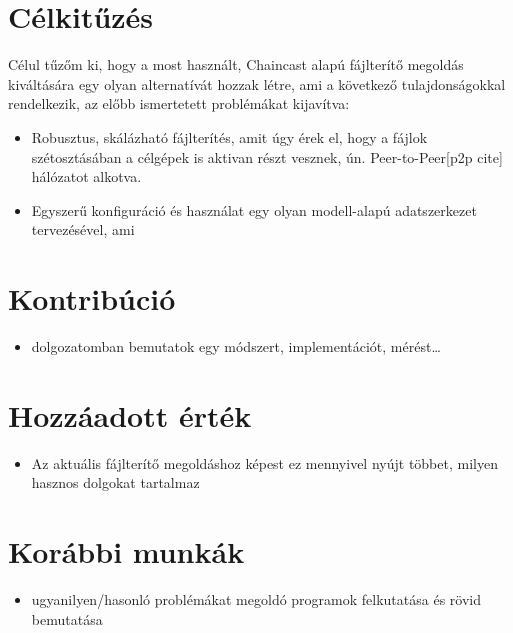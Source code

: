 \section{Célkitűzés}

Célul tűzőm ki, hogy a most használt, Chaincast alapú fájlterítő megoldás kiváltására egy olyan alternatívát hozzak létre, ami a következő tulajdonságokkal rendelkezik, az előbb ismertetett problémákat kijavítva:

\begin{itemize}
  \item Robusztus, skálázható fájlterítés, amit úgy érek el, hogy a fájlok szétosztásában a célgépek is aktivan részt vesznek, ún. Peer-to-Peer[p2p cite] hálózatot alkotva.
  \item Egyszerű konfiguráció és használat egy olyan modell-alapú adatszerkezet tervezésével, ami
\end{itemize}



\section{Kontribúció}
\begin{itemize}
  \item dolgozatomban bemutatok egy módszert, implementációt, mérést\ldots
\end{itemize}

\section{Hozzáadott érték}
\begin{itemize}
  \item Az aktuális fájlterítő megoldáshoz képest ez mennyivel nyújt többet, milyen hasznos dolgokat tartalmaz
\end{itemize}

\section{Korábbi munkák}
\begin{itemize}
  \item ugyanilyen/hasonló problémákat megoldó programok felkutatása és rövid bemutatása
\end{itemize}

